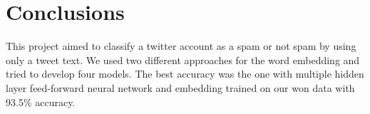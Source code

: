 \section{Conclusions}
This project aimed to classify a twitter account as a spam or not spam by using only a tweet text. We used two different approaches for the word embedding and tried to develop four models. The best accuracy was the one with multiple hidden layer feed-forward neural network and embedding trained on our won data with 93.5\% accuracy. 
\label{sec:conclusions}